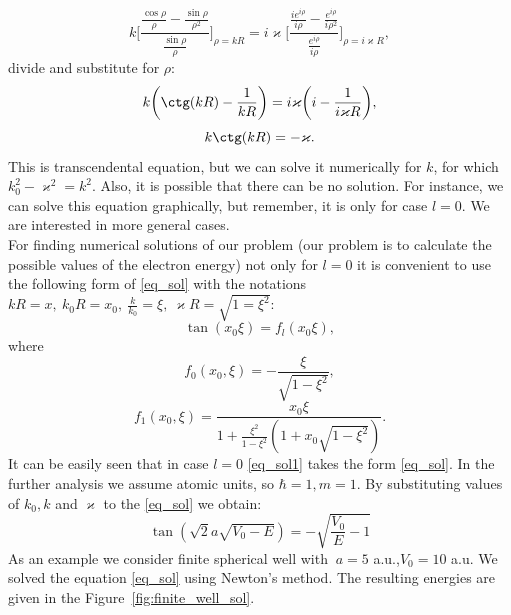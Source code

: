 \documentclass[a4paper, 12pt]{article}
\begin{document}
$$k \bigg[ \frac{\frac{\cos \rho}{\rho} - \frac{\sin \rho}{\rho^2}}{\frac{\sin \rho}{\rho}} \bigg]_{\rho = kR} = i \varkappa \bigg[ \frac{\frac{i e^{i \rho}}{i \rho} - \frac{e^{i \rho}}{i \rho^2}}{\frac{e^{i \rho}}{i \rho}} \bigg]_{\rho = i \varkappa R},
$$
divide and substitute for  $\rho$:
$$k \bigg(\ctg(kR)-\frac{1}{kR}\bigg) = i \varkappa \bigg( i - \frac{1}{i \varkappa R} \bigg),$$
\begin{equation}\label{eq_sol}
	k \ctg(kR) = - \varkappa.
\end{equation}
This is transcendental equation, but we can solve it numerically for  $k$,  for which $k_0^2-\varkappa^2=k^2.$ Also, it is possible that there can be no solution. For instance, we can solve this equation graphically, but remember, it is only for case $l=0.$ We are interested in more general cases.\\
For finding numerical solutions of our problem (our problem is to calculate the possible values of the electron energy) not only for $l=0$ it is convenient to use the following form of \eqref{eq_sol} with the notations $kR = x, ~k_0 R=x_0, ~\frac{k}{k_0} = \xi, ~\varkappa R = \sqrt{1=\xi^2}$:
\begin{equation}\label{eq_sol1}
	\tan(x_0 \xi) = f_l(x_0 \xi),
\end{equation}
where
$$f_0(x_0, \xi) = -\frac{\xi}{\sqrt{1-\xi^2}},$$
$$f_1(x_0, \xi) = \frac{x_0 \xi}{1+\frac{\xi^2}{1-\xi^2}(1+x_0 \sqrt{1-\xi^2})}.$$ 
It can be easily seen that in case $l=0$ \eqref{eq_sol1} takes the form \eqref{eq_sol}. In the further analysis we assume atomic units, so $\hbar = 1, m=1.$ By substituting values of $k_0, k$ and $\varkappa$ to the \eqref{eq_sol} we obtain:
$$\tan(\sqrt{2} a \sqrt{V_0-E})=-\sqrt{\frac{V_0}{E}-1}$$ 
As an example we consider finite spherical well with $\ a = 5 $ a.u.,$ V_0 = 10$ a.u. We solved the equation \eqref{eq_sol} using Newton's method. The resulting energies are given in the Figure~\ref{fig:finite_well_sol}.
\end{document}
